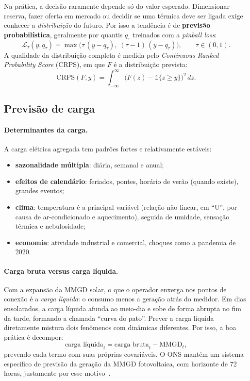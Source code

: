 \documentclass[11pt,a4paper]{article}
\begin{document}
Na prática, a decisão raramente depende só do valor esperado. Dimensionar
reserva, fazer oferta em mercado ou decidir se uma térmica deve ser ligada
exige conhecer a \emph{distribuição} do futuro. Por isso a tendência é de
\textbf{previsão probabilística}, geralmente por quantis $q_\tau$ treinados
com a \textit{pinball loss}:
\begin{equation}
  \mathcal{L}_\tau(y, q_\tau) =
  \max\big(\tau\,(y - q_\tau),\; (\tau - 1)\,(y - q_\tau)\big),
  \qquad \tau \in (0,1).
\end{equation}
A qualidade da distribuição completa é medida pelo \textit{Continuous Ranked
Probability Score} (CRPS), em que $F$ é a distribuição prevista:
\begin{equation}
  \mathrm{CRPS}(F, y) = \int_{-\infty}^{\infty}
  \big(F(z) - \mathbb{1}\{z \ge y\}\big)^2 \, dz.
\end{equation}

\subsection{Previsão de carga}

\paragraph{Determinantes da carga.} A carga elétrica agregada tem padrões
fortes e relativamente estáveis:
\begin{itemize}
  \item \textbf{sazonalidade múltipla}: diária, semanal e anual;
  \item \textbf{efeitos de calendário}: feriados, pontes, horário de verão
    (quando existe), grandes eventos;
  \item \textbf{clima}: temperatura é a principal variável (relação não
    linear, em ``U'', por causa de ar-condicionado e aquecimento), seguida de
    umidade, sensação térmica e nebulosidade;
  \item \textbf{economia}: atividade industrial e comercial, choques como a
    pandemia de 2020.
\end{itemize}

\paragraph{Carga bruta versus carga líquida.} Com a expansão da MMGD solar, o
que o operador enxerga nos pontos de conexão é a \emph{carga líquida}: o
consumo menos a geração atrás do medidor. Em dias ensolarados, a carga
líquida afunda ao meio-dia e sobe de forma abrupta no fim da tarde, formando
a chamada ``curva do pato''. Prever a carga líquida diretamente mistura dois
fenômenos com dinâmicas diferentes. Por isso, a boa prática é decompor:
\begin{equation}
  \text{carga líquida}_t = \text{carga bruta}_t - \text{MMGD}_t,
\end{equation}
prevendo cada termo com suas próprias covariáveis. O ONS mantém um sistema
específico de previsão da geração da MMGD fotovoltaica, com horizonte de
72 horas, justamente por esse motivo~\cite{onssolar}.
\end{document}
